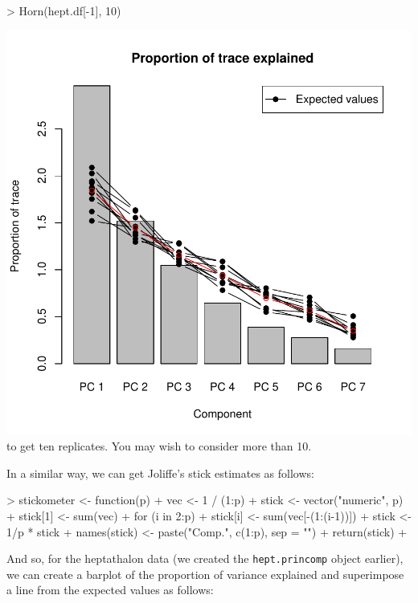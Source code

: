 \documentclass[11pt]{article}
\begin{document}
\begin{Schunk}
\begin{Sinput}
> Horn(hept.df[-1], 10)
\end{Sinput}
\end{Schunk}
\includegraphics{STAT3401Week5PCAlab-hornhept}
to get ten replicates.  You may wish to consider more than 10.


In a similar way, we can get Joliffe's stick estimates as follows:

\begin{Schunk}
\begin{Sinput}
>  stickometer <- function(p){
+   vec <- 1 / (1:p)
+   stick <- vector("numeric", p) 
+   stick[1] <- sum(vec)
+      for (i in 2:p){
+      stick[i] <- sum(vec[-(1:(i-1))])}
+   stick <- 1/p * stick
+   names(stick) <- paste("Comp.", c(1:p), sep = "")
+   return(stick)
+ }
\end{Sinput}
\end{Schunk}

And so, for the heptathalon data (we created the \texttt{hept.princomp} object earlier), we can create a barplot of the proportion of variance explained and superimpose a line from the expected values as follows:
\end{document}
